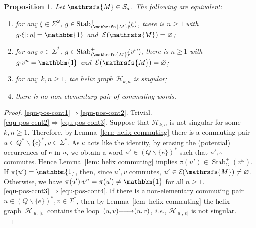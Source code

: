 \documentclass{amsart}
\newtheorem{proposition}[theorem]{Proposition}
\begin{document}
{\begin{proposition}\label{prop: equivalence positive continuity}
Let ${{{\mathrsfs{{M}}}}}\in{\hbox{${\mathcal S}_{a}$}}$. The following are equivalent:
\begin{enumerate}[label=(\roman{enumi})]
\item \label{equ-pos-cont1}for any $\xi\in {{{\Sigma}}}^{\omega}$, $g\in\operatorname{Stab}^{+}_{{{{\langle}{{\mathrsfs{{{M}}}}}{\rangle}}}\!\!}(\xi)$, there
  is $n\ge 1$ with $g{{{\cdot}}} \xi[:\!n]=\operatorname{\mathbbm{1}}$ and~$\mathcal{E}({{{\mathrsfs{{M}}}}})=\varnothing$;
\item \label{equ-pos-cont2}for any $v\in {{{\Sigma}}}^{*}$, $g\in\operatorname{Stab}^{+}_{{{{\langle}{{\mathrsfs{{{M}}}}}{\rangle}}}\!\!}(v^{\omega})$, there
  is $n\ge 1$ with~$g{{{\cdot}}} v^n=\operatorname{\mathbbm{1}}$ and~$\mathcal{E}({{{\mathrsfs{{M}}}}})=\varnothing$; 
\item \label{equ-pos-cont3}for any~$k,n\ge 1$, the helix graph $\mathcal{H}_{k,n}$ is singular;
\item \label{equ-pos-cont4}there is no non-elementary pair of commuting words.
\end{enumerate}
\end{proposition}
\begin{proof}
\ref{equ-pos-cont1}$\Rightarrow$\ref{equ-pos-cont2}. Trivial. \\
\ref{equ-pos-cont2}$\Rightarrow$\ref{equ-pos-cont3}. Suppose that $\mathcal{H}_{k,n}$ is not
  singular for some~$k,n\ge 1$. Therefore, by Lemma~\ref{lem: helix
    commuting} there is a commuting pair $u\in
  {{{Q}}}^{*}\smallsetminus\{e\}^{*}, v\in {{{\Sigma}}}^{*}$. As $e$ acts like the identity, by erasing the (potential) occurrences of $e$ in $u$, we obtain a word  $u'\in ({{{Q}}}\smallsetminus\{e\})^{*}$ such that $u', v$ commutes. Hence Lemma~\ref{lem: helix commuting} implies $\pi(u')\in \operatorname{Stab}^{+}_{G}(v^{\omega})$. If $\pi(u')=\operatorname{\mathbbm{1}}$, then, since $u',v$ commutes, $u'\in \mathcal{E}({{{\mathrsfs{{M}}}}})\neq \varnothing$. Otherwise, we have $\pi(u'){{{\cdot}}} v^{n}=\pi(u')\neq \operatorname{\mathbbm{1}}$ for all $n\ge 1$. \\
\ref{equ-pos-cont3}$\Rightarrow$\ref{equ-pos-cont4}. If there is a non-elementary commuting pair $u\in ({{{Q}}}\smallsetminus\{e\})^{*}, v\in {{{\Sigma}}}^{*}$, then by Lemma~\ref{lem: helix commuting} the helix graph~$\mathcal{H}_{|u|,|v|}$ contains the loop~$(u,v){\smash{\stackrel{\text{\tiny{${}$}}}{\relbar\joinrel\longrightarrow}}} (u,v)$, \emph{i.e.}, $\mathcal{H}_{|u|,|v|}$ is not singular. \\

\end{proof}}
\end{document}
